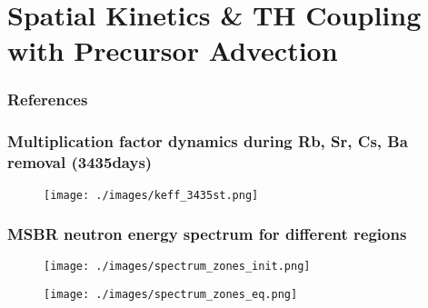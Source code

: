 \documentclass[9pt,handout]{beamer}
\begin{document}
\section{Spatial Kinetics \& TH Coupling with Precursor Advection}



\begin{frame}[allowframebreaks]
  \frametitle{References}
  
  {\footnotesize  }

\end{frame}





\begin{frame}
  \frametitle{Multiplication factor dynamics during Rb, Sr, Cs, Ba removal (3435days)}
               \begin{figure}[t]
                \vspace*{-0.1in}
                \texttt{[image: ./images/keff\_3435st.png]}
               \end{figure}

\end{frame}


\begin{frame}
  \frametitle{\gls{MSBR} neutron energy spectrum for different regions}
               \begin{figure}[t]
                \vspace*{-0.1in}
                \texttt{[image: ./images/spectrum\_zones\_init.png]}
               \end{figure}
               \begin{figure}[t]
                \vspace*{-0.1in}
                \texttt{[image: ./images/spectrum\_zones\_eq.png]}
               \end{figure}

\end{frame}
\end{document}
